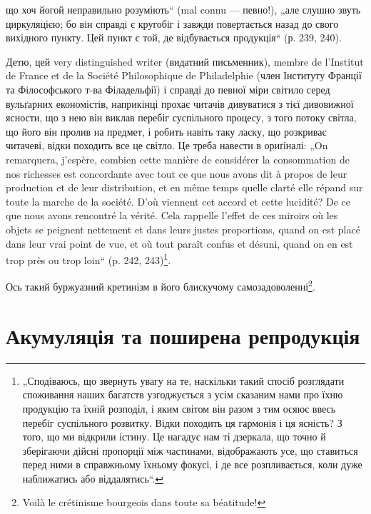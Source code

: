 \parcont{}  %
що хоч йогой неправильно розуміють“ (mal connu — певно!), „але слушно звуть циркуляцією; бо він
справді є кругобіг і завжди повертається назад до свого вихідного пункту. Цей пункт є той, де
відбувається продукція“ (р. 239, 240).

Детю, цей very distinguished writer (видатний письменник), membre de l’Institut de France et de la
Société Philosophique de Philadelphie (член Інституту Франції та Філософського т-ва Філадельфії) і
справді до певної міри світило серед вульґарних економістів, наприкінці прохає читачів дивуватися з
тієї дивовижної ясности, що з нею він виклав перебіг суспільного процесу, з того потоку світла, що
його він пролив на предмет, і робить навіть таку ласку, що розкриває читачеві, відки походить все це
світло. Це треба навести в ориґіналі: „On remarquera, j’espère, combien cette manière de considérer
la consommation de nos richesses est concordante avec tout ce que nous avons dit à propos de leur
production et de leur distribution, et en même temps quelle clarté elle répand sur toute la marche
de la société. D'où viennent cet accord et cette lucidité? De ce que nous avons rencontré la vérité.
Cela rappelle l’effet de ces miroirs où les objets se peignent nettement et dans leurs justes
proportions, quand on est placé dans leur vrai point de vue, et où tout paraît confus et désuni,
quand on en est trop près ou trop loin“ (p. 242, 243)\footnote*{
„Сподіваюсь, що звернуть увагу на те, наскільки такий спосіб розглядати споживання наших багатств
узгоджується з усім сказаним нами про їхню продукцію та їхній розподіл, і яким світом він разом з
тим осяює ввесь перебіг суспільного розвитку. Відки походить ця гармонія і ця ясність? З того, що ми
відкрили істину. Це нагадує нам ті дзеркала, що точно й зберігаючи дійсні пропорції між частинами,
відображають усе, що ставиться перед ними в справжньому їхньому фокусі, і де все розпливається, коли
дуже наближатись або віддалятись“.
}.

Ось такий буржуазний кретинізм в його блискучому самозадоволенні\footnote*{
Voilà le crétinisme bourgeois dans toute sa béatitude!
}.
\label{original-380-1}

\section[Акумуляція та поширена репродукція]{Акумуляція та поширена репродукція\footnotemark{}}

